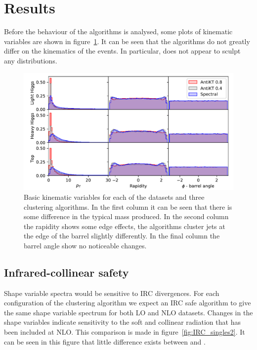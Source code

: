 \section{Results}

Before the behaviour of the algorithms is analysed, some plots of kinematic variables are shown
in figure~\ref{fig:kinematics}.
It can be seen that the algorithms do not greatly differ on the kinematics of the events.
In particular, \spectral{} does not appear to sculpt any distributions.

\begin{figure}[htp]
    \begin{minipage}[c]{0.7\textwidth}
    \begin{center}
    \includegraphics[width=\textwidth]{graphics/kinematics}
\end{center}
\end{minipage}
    \begin{minipage}[c]{0.25\textwidth}
        \caption{Basic kinematic variables for each of the datasets and three clustering algorithms.
            In the first column it can be seen that there is some difference in the typical mass produced.
            In the second column the rapidity shows some edge effects,
            the algorithms cluster jets at the edge of the barrel slightly differently.
            In the final column the barrel angle show no noticeable changes.
        }\label{fig:kinematics}
\end{minipage}
\end{figure}

\subsection{Infrared-collinear safety}
Shape variable spectra would be sensitive to IRC divergences.
For each configuration of the clustering algorithm we expect an IRC safe algorithm to give the 
same shape variable spectrum for both LO and NLO datasets.
Changes in the shape variables indicate sensitivity to the soft and collinear radiation that
has been included at NLO.
This comparison is made in figure~\ref{fig:IRC_singles2}.
It can be seen in this figure that little difference exists between \genkt{} and \spectral{}.


